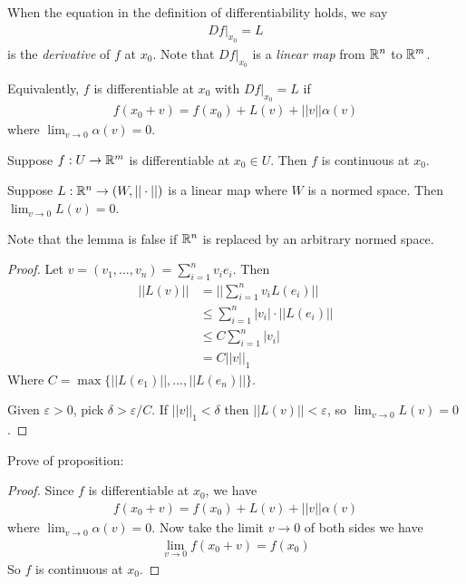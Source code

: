 \documentclass[a4paper]{article}
\begin{document}
When the equation in the definition of differentiability holds, we say
\begin{equation*}
\begin{aligned}
Df|_{x_0} = L
\end{aligned}
\end{equation*}
is the \emph{derivative} of $f$ at $x_0$. Note that $Df|_{x_0}$ is a \emph{linear map} from $\mathbb{R}^n$ to $\mathbb{R}^m$.

Equivalently, $f$ is differentiable at $x_0$ with $Df|_{x_0}=L$ if 
\begin{equation*}
\begin{aligned}
f(x_0+v)=f(x_0)+L(v)+||v||\alpha(v)
\end{aligned}
\end{equation*}
where $\lim_{v\to 0} \alpha(v) = 0$.

\begin{prop}
Suppose $f:U\to \mathbb{R}^m$ is differentiable at $x_0 \in U$. Then $f$ is continuous at $x_0$.
\end{prop}

\begin{lemma}
Suppose $L:\mathbb{R}^n \to (W,||\cdot||)$ is a linear map where $W$ is a normed space. Then $\lim_{v \to 0} L(v) = 0$.
\end{lemma}

Note that the lemma is false if $\mathbb{R}^n$ is replaced by an arbitrary normed space.

\begin{proof}
Let $v=(v_1,...,v_n) = \sum_{i=1}^n v_i e_i$. Then
\begin{equation*}
\begin{aligned}
||L(v)||&=||\sum_{i=1}^n v_i L(e_i)||\\
&\leq \sum_{i=1}^n |v_i| \cdot ||L(e_i)||\\
&\leq C\sum_{i=1}^n |v_i| \\
&= C||v||_1
\end{aligned}
\end{equation*}
Where $C=\max \{||L(e_1)||,...,||L(e_n)||\}$.

Given $\varepsilon>0$, pick $\delta > \varepsilon/C$. If $||v||_1 < \delta$ then $||L(v)||<\varepsilon$, so $\lim_{v\to 0}L(v) = 0$.
\end{proof}

Prove of proposition:
\begin{proof}
Since $f$ is differentiable at $x_0$, we have
\begin{equation*}
\begin{aligned}
f(x_0+v) = f(x_0)+L(v)+||v||\alpha(v)
\end{aligned}
\end{equation*}
where $\lim_{v\to 0} \alpha(v) = 0$. Now take the limit $v \to 0$ of both sides we have
\begin{equation*}
\begin{aligned}
\lim_{v\to 0} f(x_0+v) = f(x_0)
\end{aligned}
\end{equation*}
So $f$ is continuous at $x_0$.
\end{proof}
\end{document}
